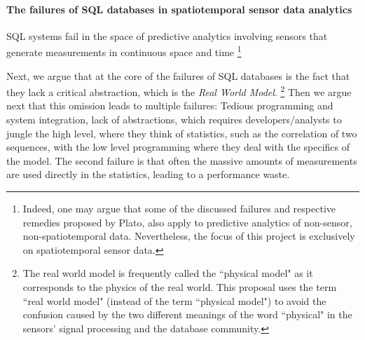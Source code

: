 
\paragraph{The failures of SQL databases in spatiotemporal sensor data analytics}
SQL systems fail in the space of predictive analytics involving
sensors that generate measurements in continuous space and time
%
\footnote{Indeed, one may argue that some of the discussed failures and respective remedies proposed by Plato, also apply to predictive analytics of non-sensor, non-spatiotemporal data. Nevertheless, the focus of this project is exclusively on spatiotemporal sensor data.
} 

Next, we argue that at the core of the failures of SQL databases is the fact that they lack a critical abstraction, which is the {\em Real World Model}.%
\footnote{The real world model is frequently called the ``physical model" as it corresponds to the physics of the real world. This proposal uses the term ``real world model" (instead of the term ``physical model") to avoid the confusion caused by the two different meanings of the word ``physical" in the sensors' signal processing and the database community.
}
Then we argue next that this omission leads to multiple failures: Tedious programming and system integration, lack of abstractions, which requires developers/analysts to jungle the high level, where they think of statistics, such as the correlation of two sequences, with the low level programming where they deal with the specifics of the model. The second failure is that often the massive amounts of measurements are used directly in the statistics, leading to a performance waste.

